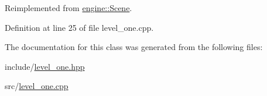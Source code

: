 Reimplemented from \hyperlink{classengine_1_1_scene_a279192188f7c239355209afd3e7c16ac}{engine\+::\+Scene}.



Definition at line 25 of file level\+\_\+one.\+cpp.



The documentation for this class was generated from the following files\+:\begin{DoxyCompactItemize}
\item 
include/\hyperlink{level__one_8hpp}{level\+\_\+one.\+hpp}\item 
src/\hyperlink{level__one_8cpp}{level\+\_\+one.\+cpp}\end{DoxyCompactItemize}
